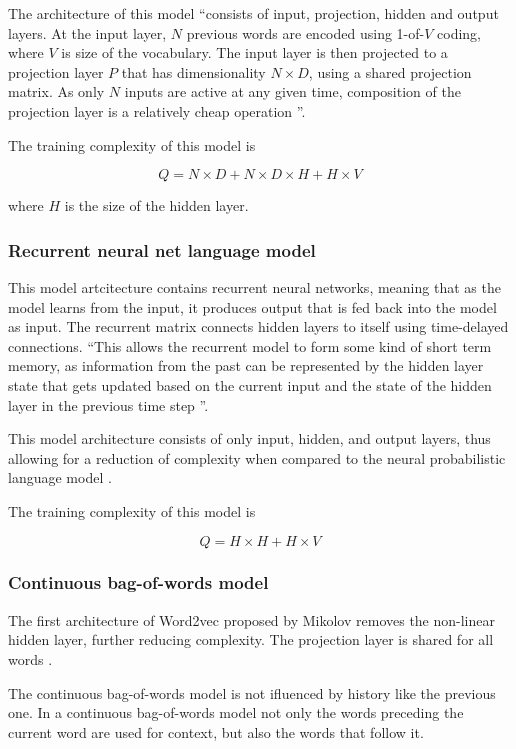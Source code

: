 \documentclass[14pt, a4paper]{extreport}
\begin{document}
The architecture of this model ``consists of input, projection, hidden and output layers. At the input layer, \(N\) previous words are encoded using 1-of-\(V\) coding, where \(V\) is size of the vocabulary. The input layer is then projected to a projection layer \(P\) that has dimensionality \(N \times D\), using a shared projection matrix. As only \(N\) inputs are active at any given time, composition of the projection layer is a relatively cheap operation \parencite{mikolov}''.

The training complexity of this model is

\[Q = N \times D + N \times D \times H + H \times V\]

where \(H\) is the size of the hidden layer.

      \subsubsection{Recurrent neural net language model}
This model artcitecture contains recurrent neural networks, meaning that as the model learns from the input, it produces output that is fed back into the model as input. The recurrent matrix connects hidden layers to itself using time-delayed connections. ``This allows the recurrent model to form some kind of short term memory, as information from the past can be represented by the hidden layer state that gets updated based on the current input and the state of the hidden layer in the previous time step \parencite{mikolov}''.

This model architecture consists of only input, hidden, and output layers, thus allowing for a reduction of complexity when compared to the neural probabilistic language model \parencite{mikolov}.

The training complexity of this model is

\[Q = H \times H + H \times V\]
      \subsubsection{Continuous bag-of-words model}
The first architecture of Word2vec proposed by Mikolov removes the non-linear hidden layer, further reducing complexity. The projection layer is shared for all words \parencite{mikolov}.

The continuous bag-of-words model is not ifluenced by history like the previous one. In a continuous bag-of-words model not only the words preceding the current word are used for context, but also the words that follow it.
\end{document}
